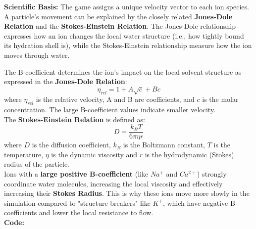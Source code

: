 \documentclass[11pt]{article}
\begin{document}
\begin{tcolorbox}[colback=cyan!5,colframe=cyan!50!black,title=Game Mechanic: Ion Velocity Scaling]

	\textbf{Scientific Basis:} The game assigns a unique velocity vector to each ion species. A particle's movement can be explained by the closely related \textbf{Jones-Dole Relation} and the \textbf{Stokes-Einstein Relation}. The Jones-Dole relationship expresses how an ion changes the local water structure (i.e., how tightly bound its hydration shell is), while the Stokes-Einstein relationship measure how the ion moves through water.

The B-coefficient determines the ion's impact on the local solvent structure \cite{JenkinsY2995} as expressed in the \textbf{Jones-Dole Relation}:
\[ \eta_{rel} = 1 + A\sqrt{c} + Bc \]
where $\eta_{rel}$ is the relative velocity, A and B are coefficients, and $c$ is the molar concentration. The large B-coefficient values indicate smaller velocity.\\

The \textbf{Stokes-Einstein Relation} is defined as:
\[ D = \frac{k_B T}{6 \pi \eta r} \]
where $D$ is the diffusion coefficient, $k_B$ is the Boltzmann constant, $T$ is the temperature, $\eta$ is the dynamic viscosity and $r$ is the hydrodynamic (Stokes) radius of the particle.\\

	Ions with a \textbf{large positive B-coefficient} (like $Na^+$ and $Ca^{2+}$) strongly coordinate water molecules, increasing the local viscosity and effectively increasing their \textbf{Stokes Radius}. This is why these ions move more slowly in the simulation compared to "structure breakers" like $K^+$, which have negative B-coefficients and lower the local resistance to flow.\\

	\textbf{Code:}


\end{tcolorbox}
\end{document}
